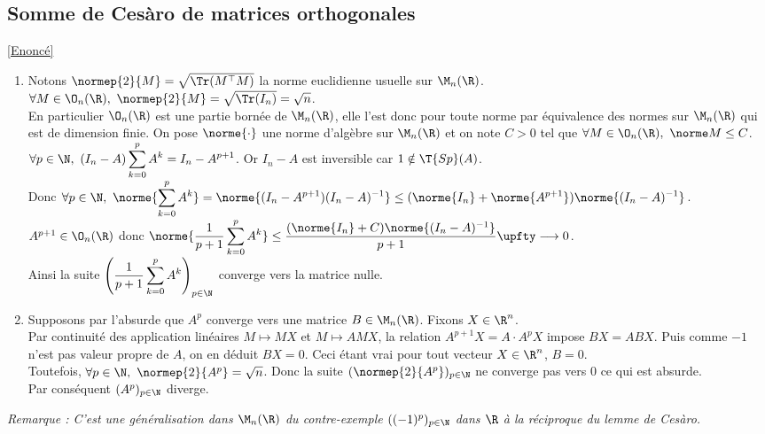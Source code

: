 \documentclass[8pt]{book}
\begin{document}
	\subsection{Somme de Cesàro de matrices orthogonales }
	\label{Somme de Cesàro de matrices orthogonales corrigé}
	\textcolor{blue}{\hyperref[Somme de Cesàro de matrices orthogonales]{[Enoncé]}}\\
	\begin{enumerate}[leftmargin=*]
		\item Notons $\normep{2}{M}=\sqrt{\Tr(M^\top M)}$ la norme euclidienne usuelle sur $\M_n(\R)$. $\forall M\in \O_n(\R),\ \normep{2}{M}=\sqrt{\Tr(I_n)}=\sqrt n$.\\
		En particulier $\O_n(\R)$ est une partie bornée de $\M_n(\R)$, elle l'est donc pour toute norme par équivalence des normes sur $\M_n(\R)$ qui est de dimension finie. On pose $\norme{\cdot}$ une norme d'algèbre sur $\M_n(\R)$ et on note $C>0$ tel que $\forall M\in \O_n(\R),\ \norme M\leq C$.\\
		$\forall p\in \N,\ (I_n-A)\displaystyle\sum_{k=0}^pA^k=I_n-A^{p+1}$. Or $I_n-A$ est inversible car $1\notin \T{Sp}(A)$.\\
		Donc $\forall p\in \N,\ \displaystyle\norme{\sum_{k=0}^pA^k}=\norme{(I_n-A^{p+1})(I_n-A)^{-1}}\leq (\norme{I_n}+\norme{A^{p+1}})\norme{(I_n-A)^{-1}}$.\\
		$A^{p+1}\in \O_n(\R)$ donc $\displaystyle\norme{\frac{1}{p+1}\sum_{k=0}^pA^k}\leq \frac{(\norme{I_n}+C)\norme{(I_n-A)^{-1}}}{p+1}\upfty\longrightarrow 0$.\\
		Ainsi la suite $\left(\displaystyle\frac{1}{p+1}\sum_{k=0}^pA^k\right)_{p\in \N}$ converge vers la matrice nulle.
		\item Supposons par l'absurde que $A^p$ converge vers une matrice $B\in \M_n(\R)$. Fixons $X\in \R^n$.\\
		Par continuité des application linéaires $M\mapsto MX$ et $M\mapsto AMX$, la relation $A^{p+1}X=A\cdot A^pX$ impose $BX=ABX$. Puis comme $-1$ n'est pas valeur propre de $A$, on en déduit $BX=0$. Ceci étant vrai pour tout vecteur $X\in \R^n$, $B=0$.\\
		Toutefois, $\forall p\in \N,\ \normep{2}{A^p}=\sqrt n$. Donc la suite $(\normep{2}{A^p})_{p\in \N}$ ne converge pas vers $0$ ce qui est absurde.\\
		Par conséquent $(A^p)_{p\in \N}$ diverge.
	\end{enumerate}
	\textit{Remarque : C'est une généralisation dans $\M_n(\R)$ du contre-exemple $((-1)^p)_{p\in \N}$ dans $\R$ à la réciproque du lemme de Cesàro.}
	
\end{document}
